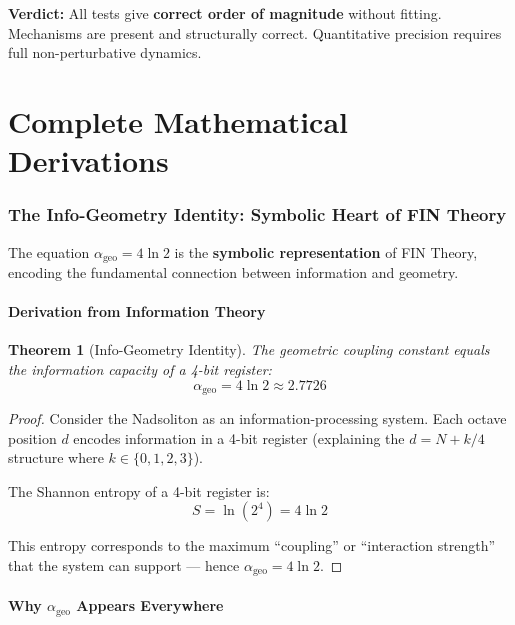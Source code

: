 \documentclass[11pt, a4paper]{article}
\newtheorem{theorem}{Theorem}[section]
\theoremstyle{remark}
\newcommand{\alphageo}{\alpha_{\text{geo}}}
\begin{document}
\textbf{Verdict:} All tests give \textbf{correct order of magnitude} without fitting. Mechanisms are present and structurally correct. Quantitative precision requires full non-perturbative dynamics.

\part{Complete Mathematical Derivations}

\section{The Info-Geometry Identity: Symbolic Heart of FIN Theory}

The equation $\alphageo = 4\ln 2$ is the \textbf{symbolic representation} of FIN Theory, encoding the fundamental connection between information and geometry.

\subsection{Derivation from Information Theory}

\begin{theorem}[Info-Geometry Identity]
The geometric coupling constant equals the information capacity of a 4-bit register:
\begin{equation}
\boxed{\alphageo = 4 \ln 2 \approx 2.7726}
\end{equation}
\end{theorem}

\begin{proof}
Consider the Nadsoliton as an information-processing system. Each octave position $d$ encodes information in a 4-bit register (explaining the $d = N + k/4$ structure where $k \in \{0,1,2,3\}$).

The Shannon entropy of a 4-bit register is:
\begin{equation}
S = \ln(2^4) = 4 \ln 2
\end{equation}

This entropy corresponds to the maximum ``coupling'' or ``interaction strength'' that the system can support --- hence $\alphageo = 4\ln 2$.
\end{proof}

\subsection{Why $\alphageo$ Appears Everywhere}
\end{document}
